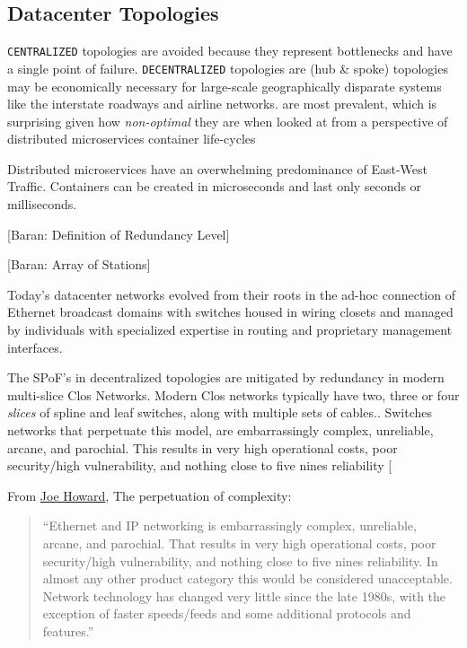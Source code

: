 \documentclass[../../../OAE-SPEC-MAIN.tex]{subfiles}
\begin{document}
\subsection*{Datacenter Topologies}
\texttt{CENTRALIZED} topologies are avoided because they represent bottlenecks and have a single point of failure. %
\texttt{DECENTRALIZED} topologies are (hub \& spoke) topologies may be economically necessary for large-scale geographically disparate systems like the interstate roadways and airline networks. are  
most prevalent,  which is surprising given how \emph{non-optimal} they are  when looked at
from a perspective of distributed microservices container life-cycles

 Distributed microservices have an overwhelming predominance of East-West Traffic.  Containers can be created in microseconds and last only seconds or milliseconds.
 

 
[Baran: Definition of Redundancy Level]

[Baran: Array of Stations]
 
 

Today's datacenter networks evolved from their roots in the ad-hoc connection of Ethernet broadcast domains with switches housed in wiring closets and managed by individuals with specialized expertise in routing and proprietary management interfaces.

 The SPoF's in decentralized topologies are mitigated by redundancy in modern multi-slice Clos Networks. Modern Clos networks typically have two, three or four \emph{slices} of spline and leaf switches, along with multiple sets of cables..
Switches  networks that perpetuate this model, are embarrassingly complex, unreliable, arcane, and parochial. This results in very high operational costs, poor security/high vulnerability, and nothing close to five nines reliability
 [{From \href{https://www.linkedin.com/pulse/why-network-industry-has-been-stuck-1980s-ciscos-embrace-joe-howard}{Joe Howard}, The perpetuation of complexity:
 
 
\begin{quotation}
\noindent  ``Ethernet and IP networking is embarrassingly complex, unreliable, arcane, and parochial. That results in very high operational costs, poor security/high vulnerability, and nothing close to five nines reliability. In almost any other product category this would be considered unacceptable. Network technology has changed very little since the late 1980s, with the exception of faster speeds/feeds and some additional protocols and features.''
\end{quotation}}
\end{document}
